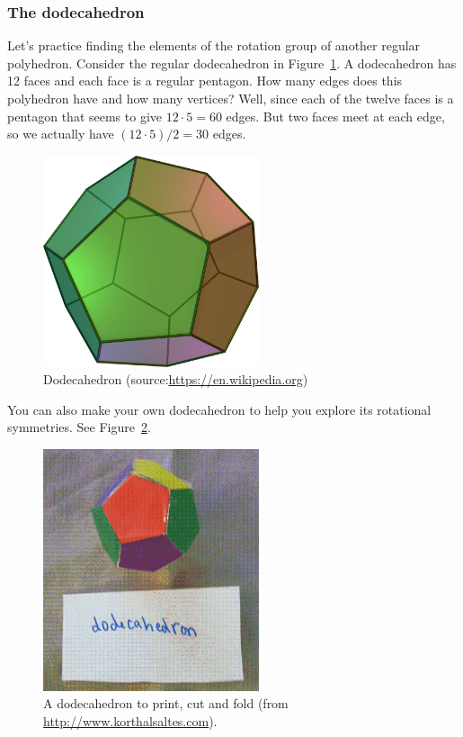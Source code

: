 \subsubsection*{The dodecahedron}
Let's practice finding the elements of the rotation group of another regular polyhedron.  Consider the regular dodecahedron in Figure~\ref{fig:Dodeca}.  A dodecahedron has 12 faces and each face is a regular pentagon.  How many edges does this polyhedron have and how many vertices?  Well, since each of the twelve faces is a pentagon that seems to give $12\cdot 5=60$ edges.  But two faces meet at each edge, so we actually have $(12\cdot 5)/2=30$ edges.

\begin{figure}[ht]
\begin{center}
\includegraphics[width=2.5in]{images/Dodecahedron.png}
\caption{\label{fig:Dodeca}Dodecahedron (source:\url{https://en.wikipedia.org})}

\end{center}
\end{figure}

You can also make your own dodecahedron to help you explore its rotational symmetries. See Figure~\ref{fig:DodecaFold}.

\begin{figure}[ht]
\begin{center}
\includegraphics[width=2.5in]{images/DodecahedronFold.png}
\caption{ \label{fig:DodecaFold}A dodecahedron to print, cut and fold  (from  \url{http://www.korthalsaltes.com}).}

\end{center}
\end{figure}

